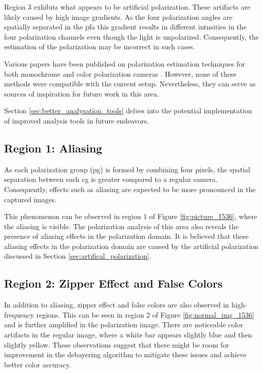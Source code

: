 Region 3 exhibits what appears to be artificial polarization.
These artifacts are likely caused by high image gradients.
As the four polarization angles are spatially separated in the \gls{pfa} this gradient results in different intnsities in the four polarization channels even though the light is unpolarized.
Consequently, the estimation of the polarization may be incorrect in such cases.

Various papers have been published on polarization estimation techniques for both monochrome and color polarization cameras \cite{mihoubiSurveyDemosaickingMethods2018} \cite{spoteJointDemosaicingColour2021}.
However, none of these methods were compatible with the current setup.
Nevertheless, they can serve as sources of inspiration for future work in this area.

Section \ref{sec:better_analysation_tools} delves into the potential implementation of improved analysis tools in future endeavors.

\subsection{Region 1: Aliasing}
As each polarization group (\gls{pg}) is formed by combining four pixels, the spatial separation between each \gls{cg} is greater compared to a regular camera.
Consequently, effects such as aliasing are expected to be more pronounced in the captured images.

This phenomenon can be observed in region 1 of Figure \ref{fig:picture_1536}, where the aliasing is visible.
The polarization analysis of this area also reveals the presence of aliasing effects in the polarization domain.
It is believed that these aliasing effects in the polarization domain are caused by the artificial polarization discussed in Section \ref{sec:artifical_polarization}.


\subsection{Region 2: Zipper Effect and False Colors}

In addition to aliasing, zipper effect and false colors are also observed in high-frequency regions.
This can be seen in region 2 of Figure \ref{fig:normal_img_1536} and is further amplified in the polarization image.
There are noticeable color artifacts in the regular image, where a white bar appears slightly blue and then slightly yellow.
These observations suggest that there might be room for improvement in the debayering algorithm to mitigate these issues and achieve better color accuracy.

